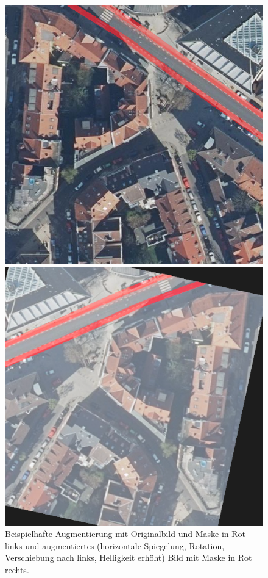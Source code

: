 \begin{figure}
	\centering
	\begin{minipage}{.45\textwidth}
		\centering
		\includegraphics[width=.7\linewidth]{Bilder/cut-example.jpg} 
	\end{minipage}
	\begin{minipage}{.45\textwidth}
		\centering
		\includegraphics[width=.7\linewidth]{Bilder/augmentation-example.png} 
	\end{minipage}

	\caption{Beispielhafte Augmentierung mit Originalbild und Maske in Rot links 
	und augmentiertes (horizontale Spiegelung, Rotation, Verschiebung nach links, Helligkeit erhöht) Bild 
	mit Maske in Rot rechts.}
	\label{fig:augmentation}
\end{figure} 

